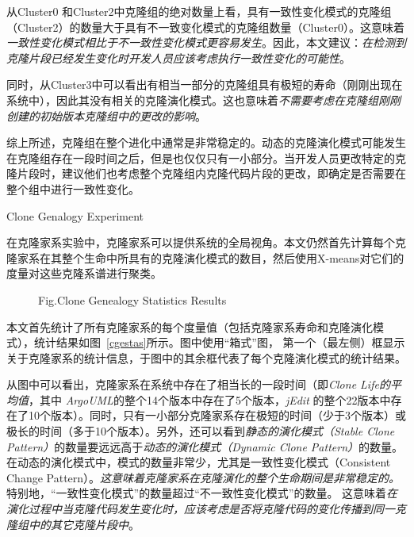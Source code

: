 {从Cluster0 和Cluster2中克隆组的绝对数量上看，具有一致性变化模式的克隆组（Cluster2）的数量大于具有不一致变化模式的克隆组数量（Cluster0）。这意味着{\em 一致性变化模式相比于不一致性变化模式更容易发生}。因此，本文建议：{\em 在检测到克隆片段已经发生变化时开发人员应该考虑执行一致性变化的可能性}。

同时，从Cluster3中可以看出有相当一部分的克隆组具有极短的寿命（刚刚出现在系统中），因此其没有相关的克隆演化模式。这也意味着{\em 不需要考虑在克隆组刚刚创建的初始版本克隆组中的更改的影响}。

综上所述，克隆组在整个进化中通常是非常稳定的。动态的克隆演化模式可能发生在克隆组存在一段时间之后，但是也仅仅只有一小部分。当开发人员更改特定的克隆片段时，建议他们也考虑整个克隆组内克隆代码片段的更改，即确定是否需要在整个组中进行一致性变化。

{Clone Genalogy Experiment} 

在克隆家系实验中，克隆家系可以提供系统的全局视角。本文仍然首先计算每个克隆家系在其整个生命中所具有的克隆演化模式的数目，然后使用X-means对它们的度量对这些克隆系谱进行聚类。
 
\begin{figure}[htbp]
\centering
\subfigure{\label{cgestas1}}\addtocounter{subfigure}{-2}
\subfigure{\label{cgestas2}}\addtocounter{subfigure}{-2}
{Fig.$\!$}{Clone Genealogy Statistics Results}
\vspace{-1em}
\end{figure}

本文首先统计了所有克隆家系的每个度量值（包括克隆家系寿命和克隆演化模式），统计结果如图~\ref{cgestas}所示。图中使用“箱式”图， 第一个（最左侧）框显示关于克隆家系的统计信息，于图中的其余框代表了每个克隆演化模式的统计结果。
 
从图中可以看出，克隆家系在系统中存在了相当长的一段时间（即{\em Clone Life的平均值}，其中 {\em  ArgoUML}的整个14个版本中存在了5个版本，{\em jEdit }的整个22版本中存在了10个版本）。同时，只有一小部分克隆家系存在极短的时间（少于3个版本）或极长的时间（多于10个版本）。另外，还可以看到{\em 静态的演化模式（Stable Clone Pattern）}的数量要远远高于{\em 动态的演化模式（Dynamic Clone Pattern）}的数量。 在动态的演化模式中，模式的数量非常少，尤其是一致性变化模式（Consistent Change Pattern）。{\em 这意味着克隆家系在克隆演化的整个生命期间是非常稳定的。}特别地，“一致性变化模式”的数量超过“不一致性变化模式”的数量。 这意味着{\em 在演化过程中当克隆代码发生变化时，应该考虑是否将克隆代码的变化传播到同一克隆组中的其它克隆片段中}。
 
}
